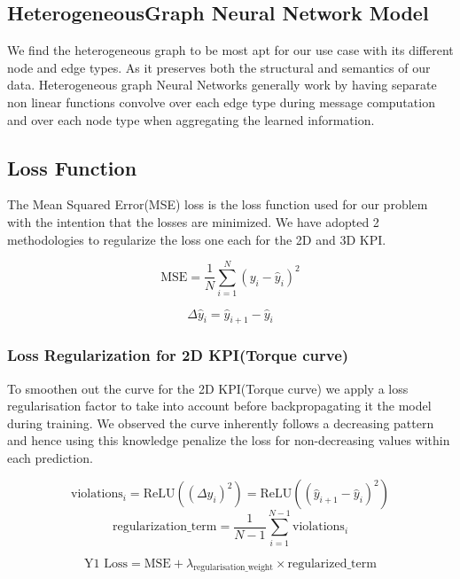 \documentclass{report} %
\begin{document}
\subsection*{HeterogeneousGraph Neural Network Model}

We find the heterogeneous graph to be most apt for our use case with its different node and edge types. As it preserves both the structural and semantics of our data.
Heterogeneous graph Neural Networks generally work by having separate non linear functions convolve over each edge type during message computation and over each node type when aggregating the learned information.
 

\subsection*{Loss Function}

The Mean Squared Error(MSE) loss is the loss function used for our problem with the intention that the losses are minimized. We have adopted 2 methodologies to regularize the loss one each for the 2D and 3D KPI.


\[
\text{MSE} = \frac{1}{N} \sum_{i=1}^{N} (y_i - \hat{y}_i)^2
\]

\[
\Delta \hat{y}_i = \hat{y}_{i+1} - \hat{y}_i
\]
\subsubsection*{Loss Regularization for 2D KPI(Torque curve)}

To smoothen out the curve for the 2D KPI(Torque curve) we apply a loss regularisation factor to take into account before backpropagating it the model during training.
We observed the curve inherently follows a decreasing pattern and hence using this knowledge penalize the loss for non-decreasing values within each prediction.



\[
\text{violations}_i = \text{ReLU}((\Delta \hat{y}_i)^2) = \text{ReLU}((\hat{y}_{i+1} - \hat{y}_i)^2)
\]
\[
\text{regularization\_term} = \frac{1}{N-1} \sum_{i=1}^{N-1} \text{violations}_i
\]

\[
\text{Y1 Loss} = \text{MSE} + \lambda_{\text{regularisation\_weight}} \times \text{regularized\_term}
\]
\end{document}
